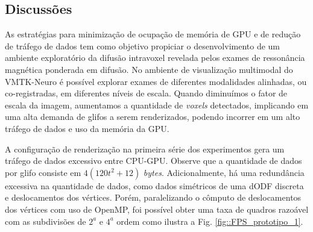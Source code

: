 \subsection{Discussões}


As estratégias para minimização de ocupação de memória de GPU e de redução de tráfego de dados tem como objetivo propiciar o desenvolvimento de um ambiente exploratório da difusão intravoxel revelada pelos exames de ressonância magnética ponderada em difusão. No ambiente de visualização multimodal do VMTK-Neuro \cite{VMTKNeuro} é possível explorar exames de diferentes modalidades alinhadas, ou co-registradas, em diferentes níveis de escala. Quando diminuímos o fator de escala da imagem, aumentamos a quantidade de \textit{voxels} detectados, implicando em uma alta demanda de glifos a serem renderizados, podendo incorrer em um alto tráfego de dados e uso da memória da GPU.


A configuração de renderização na primeira série dos experimentos gera um tráfego de dados excessivo entre CPU-GPU. Observe que a quantidade de dados por glifo consiste em $4(120t^2 + 12)$ \textit{bytes}. Adicionalmente, há uma redundância excessiva na quantidade de dados, como dados simétricos de uma dODF discreta e deslocamentos dos vértices. Porém, paralelizando o cômputo de deslocamentos dos vértices com uso de OpenMP, foi possível obter uma taxa de quadros razoável com as subdivisões de $2^a$ e $4^a$ ordem como ilustra a Fig. \ref{fig::FPS_prototipo_1}.

